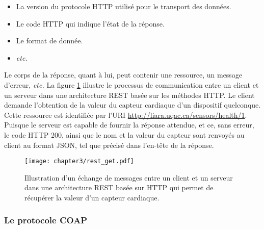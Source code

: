\begin{itemize}[label=\textbullet]
    \item
        La version du protocole \ac{HTTP} utilisé pour le transport des données.
    \item
        Le code \ac{HTTP} \citep{Fielding2014} qui indique l'état de la réponse.
    \item
        Le format de donnée.
    \item
        \textit{etc.}
\end{itemize}

\noindent Le corps de la réponse, quant à lui, peut contenir une ressource, un message d'erreur, \textit{etc.} La figure \ref{fig:rest_get} illustre le processus de communication entre un client et un serveur dans une architecture \ac{REST} basée sur les méthodes \ac{HTTP}. Le client demande l'obtention de la valeur du capteur cardiaque d'un dispositif quelconque. Cette ressource est identifiée par l'\ac{URI} \url{http://liara.uqac.ca/sensors/health/1}. Puisque le serveur est capable de fournir la réponse attendue, et ce, sans erreur, le code \ac{HTTP} 200, ainsi que le nom et la valeur du capteur sont renvoyés au client au format \ac{JSON}, tel que précisé dans l'en-tête de la réponse.

\begin{figure}[H]
	\centering
	\texttt{[image: chapter3/rest\_get.pdf]}
        \caption{Illustration d'un échange de messages entre un client et un serveur dans une architecture \ac{REST} basée sur \ac{HTTP} qui permet de récupérer la valeur d'un capteur cardiaque.}
	\label{fig:rest_get}
\end{figure}

\subsubsection{Le protocole \ac{COAP}}

